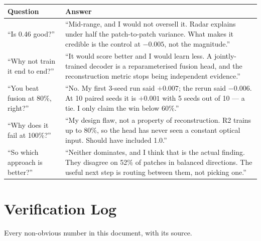 \documentclass[11pt,a4paper]{report}
\begin{document}
\begin{center}
\small
\begin{tabular}{@{}p{5.4cm}p{9.4cm}@{}}
\toprule
\textbf{Question} & \textbf{Answer} \\
\midrule
``Is 0.46 good?'' &
``Mid-range, and I would not oversell it. Radar explains under half the
patch-to-patch variance. What makes it credible is the control at $-0.005$, not
the magnitude.'' \\
\addlinespace
``Why not train it end to end?'' &
``It would score better and I would learn less. A jointly-trained decoder is a
reparameterised fusion head, and the reconstruction metric stops being
independent evidence.'' \\
\addlinespace
``You beat fusion at 80\%, right?'' &
``No. My first 3-seed run said $+0.007$; the rerun said $-0.006$. At 10 paired
seeds it is $+0.001$ with 5 seeds out of 10 --- a tie. I only claim the win
below 60\%.'' \\
\addlinespace
``Why does it fail at 100\%?'' &
``My design flaw, not a property of reconstruction. R2 trains up to 80\%, so the
head has never seen a constant optical input. Should have included 1.0.'' \\
\addlinespace
``So which approach is better?'' &
``Neither dominates, and I think that is the actual finding. They disagree on
52\% of patches in balanced directions. The useful next step is routing between
them, not picking one.'' \\
\bottomrule
\end{tabular}
\end{center}

\chapter{Verification Log}
\label{ch:verify}

Every non-obvious number in this document, with its source.
\end{document}
